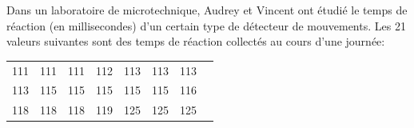 \begin{questions}

\newpage

\question[]\label{micro}
Dans un laboratoire de microtechnique, Audrey et Vincent ont étudié le temps de réaction (en millisecondes) d'un certain type de détecteur de mouvements. Les 21 valeurs suivantes sont des temps de réaction collectés au cours d'une journée:

\begin{center}
\begin{tabular}{  c c c c c c c c }
111  &111  &111  &112  &113  &113  &113 \\
113 &115  &115  &115  &115 &115 & 116 \\
118 & 118 & 118 & 119 & 125 &125 & 125\\
\end{tabular}
\end{center}


\end{questions}
